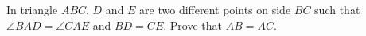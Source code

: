 In triangle $ABC$, $D$ and $E$ are two different points on side $BC$ such that $\angle BAD=\angle CAE$ and $BD=CE$. Prove that $AB=AC$.
